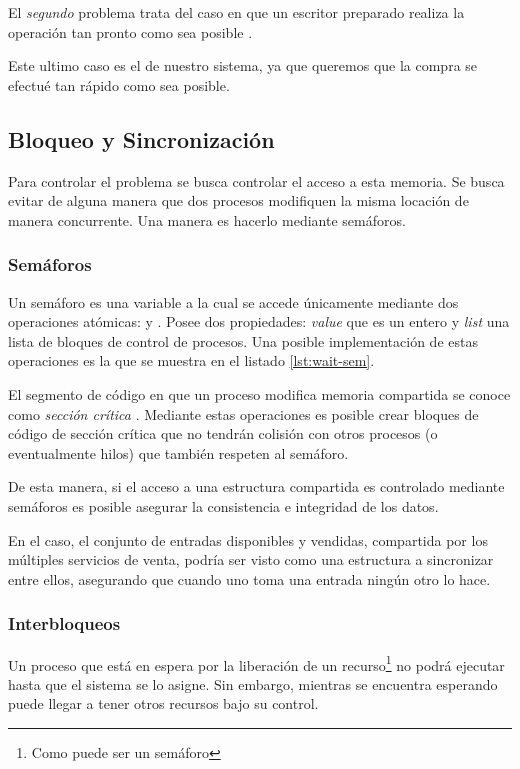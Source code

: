 El \emph{segundo} problema trata del caso en que un escritor preparado realiza la operación tan pronto como sea posible \cite{silberschatz}.

Este ultimo caso es el de nuestro sistema, ya que queremos que la compra se efectué tan rápido como sea posible.

\subsection{Bloqueo y Sincronización}
Para controlar el problema se busca controlar el acceso a esta memoria.
Se busca evitar de alguna manera que dos procesos modifiquen la misma locación de manera concurrente.
Una manera es hacerlo mediante semáforos.

\subsubsection{Semáforos}
Un semáforo es una variable a la cual se accede únicamente mediante dos
operaciones atómicas:  y  \cite{silberschatz}.
Posee dos propiedades: \emph{value} que es un entero y \emph{list} una lista de bloques de control de procesos.
Una posible implementación de estas operaciones es la que se muestra en el listado \ref{lst:wait-sem}.

El segmento de código en que un proceso modifica memoria compartida se conoce como \emph{sección crítica} \cite{silberschatz}.
Mediante estas
operaciones es posible crear bloques de código de sección crítica que no tendrán
colisión con otros procesos (o eventualmente hilos) que también respeten al
semáforo.

De esta manera, si el acceso a una estructura compartida es controlado mediante
semáforos es posible asegurar la consistencia e integridad de los datos.

En el caso, el conjunto de entradas disponibles y vendidas, compartida por los
múltiples servicios de venta, podría ser visto como una estructura a sincronizar
entre ellos, asegurando que cuando uno toma una entrada ningún otro lo hace.




\subsubsection{Interbloqueos}

Un proceso que está en espera por la liberación de un recurso\footnote{Como puede ser un semáforo} no podrá ejecutar hasta que el sistema se lo asigne.
Sin embargo, mientras se encuentra esperando puede llegar a tener otros recursos bajo su control.

